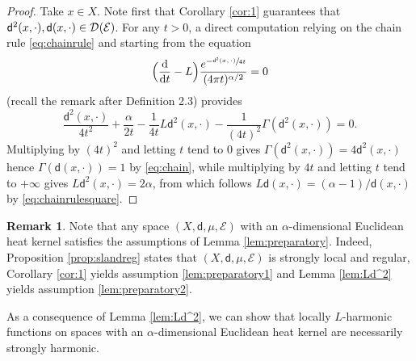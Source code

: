 \documentclass[10pt]{amsart}
\newcommand{\NoChangel}[1]{%
\expandafter\let\csname old\string#1\endcsname=#1
\let#1=\relax
\newcommand{#1}{\mathcode`l="716C\csname old\string#1\endcsname\mathcode`l="7160 }%
}
\theoremstyle{plain}
\theoremstyle{definition}
\newtheorem{remark}[theorem]{Remark}
\newcommand{\cE}{\mathcal{E}}
\newcommand{\cD}{\mathcal{D}}
\newcommand{\di}{\mathop{}\!\mathrm{d}}
\newcommand{\loc}{\mathrm{loc}}\NoChangel{\loc}
\newcommand{\dist}{\mathsf{d}}
\begin{document}
\begin{proof}
Take $x\in X$. Note first that Corollary \ref{cor:1} guarantees that $\dist^2(x,\cdot), \dist(x,\cdot) \in \cD_{\loc}(\cE)$. For any $t>0$, a direct computation relying on the chain rule \eqref{eq:chainrule} and starting from the equation
\[
\Bigl(\frac{\di}{\di t} - L \Bigr) \frac{e^{-\sfrac{\dist^2(x,\cdot)}{4t}}}{(4 \pi t)^{\alpha/2}} = 0
\]
(recall the remark after Definition 2.3) provides
\[
\frac{\dist^2(x,\cdot)}{4t^2} + \frac{\alpha}{2t} - \frac{1}{4t}L\dist^2(x,\cdot) - \frac{1}{(4t)^2}\Gamma(\dist^2(x,\cdot)) =0.
\]
Multiplying by $(4t)^2$ and letting $t$ tend to $0$ gives $\Gamma(\dist^2(x,\cdot))=4\dist^2(x,\cdot)$ hence $\Gamma(\dist(x,\cdot))=1$ by \eqref{eq:chain}, while multiplying by $4t$ and letting $t$ tend to $+\infty$ gives $L\dist^2(x,\cdot)=2\alpha$, from which follows $L\dist(x,\cdot)=(\alpha-1)/\dist(x,\cdot)$ by \eqref{eq:chainrulesquare}.
\end{proof}

\begin{remark}\label{rk:applypreparatory}
Note that any space $(X,\dist,\mu,\cE)$ with an $\alpha$-dimensional Euclidean heat kernel satisfies the assumptions of Lemma \ref{lem:preparatory}. Indeed, Proposition \ref{prop:slandreg} states that $(X,\dist,\mu,\cE)$ is strongly local and regular, Corollary \ref{cor:1} yields assumption \eqref{lem:preparatory1} and Lemma \ref{lem:Ld^2} yields assumption \eqref{lem:preparatory2}.
\end{remark}

As a consequence of Lemma \ref{lem:Ld^2}, we can show that locally $L$-harmonic functions on spaces with an $\alpha$-dimensional Euclidean heat kernel are necessarily strongly harmonic.
\end{document}
